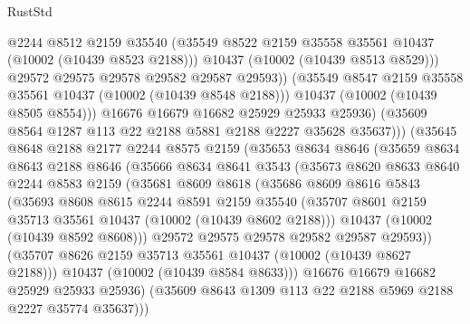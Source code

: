 \begin{lexlean}{RustStd}
\begin{coremodule}
                        @2244
                        @8512
                        @2159
                        @35540
                        (@35549 @8522 @2159 @35558 @35561 @10437 (@10002 (@10439 @8523 @2188)))
                        @10437
                        (@10002 (@10439 @8513 @8529)))
                      @29572
                      @29575
                      @29578
                      @29582
                      @29587
                      @29593))
                  (@35549 @8547 @2159 @35558 @35561 @10437 (@10002 (@10439 @8548 @2188)))
                  @10437
                  (@10002 (@10439 @8505 @8554)))
                @16676
                @16679
                @16682
                @25929
                @25933
                @25936)
              (@35609 @8564 @1287 @113 @22 @2188 @5881 @2188 @2227 @35628 @35637)))
          (@35645
            @8648
            @2188
            @2177
            @2244
            @8575
            @2159
            (@35653
              @8634
              @8646
              (@35659
                @8634
                @8643
                @2188
                @8646
                (@35666
                  @8634
                  @8641
                  @3543
                  (@35673
                    @8620
                    @8633
                    @8640
                    @2244
                    @8583
                    @2159
                    (@35681
                      @8609
                      @8618
                      (@35686
                        @8609
                        @8616
                        @5843
                        (@35693
                          @8608
                          @8615
                          @2244
                          @8591
                          @2159
                          @35540
                          (@35707 @8601 @2159 @35713 @35561 @10437 (@10002 (@10439 @8602 @2188)))
                          @10437
                          (@10002 (@10439 @8592 @8608)))
                        @29572
                        @29575
                        @29578
                        @29582
                        @29587
                        @29593))
                    (@35707 @8626 @2159 @35713 @35561 @10437 (@10002 (@10439 @8627 @2188)))
                    @10437
                    (@10002 (@10439 @8584 @8633)))
                  @16676
                  @16679
                  @16682
                  @25929
                  @25933
                  @25936)
                (@35609 @8643 @1309 @113 @22 @2188 @5969 @2188 @2227 @35774 @35637)))

\end{coremodule}
\end{lexlean}
